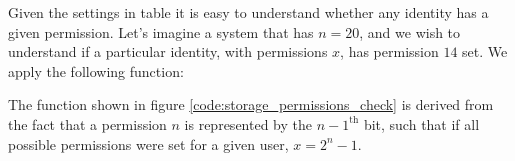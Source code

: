 Given the settings in table it is easy to understand whether any identity has a given permission. Let's imagine a system that has $n = 20$, and we wish to understand if a particular identity, with permissions $x$, has permission $14$ set. We apply the following function:



The function shown in figure \ref{code:storage_permissions_check} is derived from the fact that a permission $n$ is represented by the $n-1^{\text{th}}$ bit, such that if all possible permissions were set for a given user, $x = 2^{n} - 1$. 
